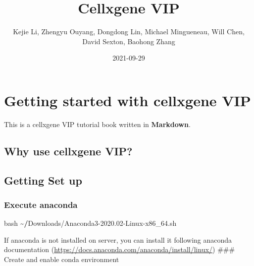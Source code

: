 \documentclass[
]{book}
\title{Cellxgene VIP}
\author{Kejie Li, Zhengyu Ouyang, Dongdong Lin, Michael Mingueneau, Will Chen, David Sexton, Baohong Zhang}
\date{2021-09-29}
\newenvironment{Shaded}{\begin{snugshade}}{\end{snugshade}}
\newcommand{\ErrorTok}[1]{\textcolor[rgb]{0.64,0.00,0.00}{\textbf{#1}}}
\newcommand{\FloatTok}[1]{\textcolor[rgb]{0.00,0.00,0.81}{#1}}
\newcommand{\NormalTok}[1]{#1}
\newcommand{\SpecialCharTok}[1]{\textcolor[rgb]{0.00,0.00,0.00}{#1}}
\begin{document}
\maketitle

{
\setcounter{tocdepth}{1}
\tableofcontents
}
\hypertarget{getting-started-with-cellxgene-vip}{%
\chapter{Getting started with cellxgene VIP}\label{getting-started-with-cellxgene-vip}}

This is a cellxgene VIP tutorial book written in \textbf{Markdown}.

\hypertarget{why-use-cellxgene-vip}{%
\section{Why use cellxgene VIP?}\label{why-use-cellxgene-vip}}

\hypertarget{getting-set-up}{%
\section{Getting Set up}\label{getting-set-up}}

\hypertarget{execute-anaconda}{%
\subsection{Execute anaconda}\label{execute-anaconda}}

\begin{Shaded}
\begin{Highlighting}[]
\NormalTok{bash }\SpecialCharTok{\textasciitilde{}}\ErrorTok{/}\NormalTok{Downloads}\SpecialCharTok{/}\NormalTok{Anaconda3}\FloatTok{{-}2020.02}\SpecialCharTok{{-}}\NormalTok{Linux}\SpecialCharTok{{-}}\NormalTok{x86\_64.sh}
\end{Highlighting}
\end{Shaded}

If anaconda is not installed on server, you can install it following anaconda documentation (\url{https://docs.anaconda.com/anaconda/install/linux/})
\#\#\# Create and enable conda environment
\end{document}
